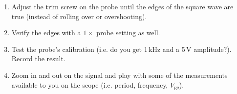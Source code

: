 \documentclass{article}
\begin{document}
\begin{enumerate}
\begin{enumerate}
\item Adjust the trim screw on the probe until the edges of the square wave are true (instead of rolling over or overshooting).
\item Verify the edges with a $1\times$ probe setting as well. 
\item Test the probe's calibration (i.e. do you get 1\,kHz and a 5\,V amplitude?). Record the result.
\item Zoom in and out on the signal and play with some of the measurements available to you on the scope (i.e. period, frequency, $V_{pp}$).
\end{enumerate}
\end{enumerate}
\end{document}
